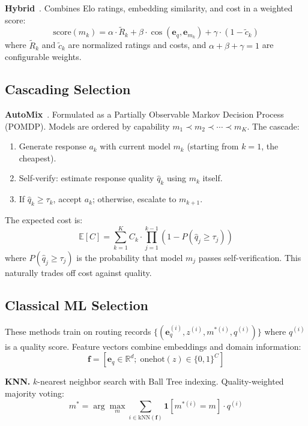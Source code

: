 \noindent\textbf{Hybrid}~\cite{hu2024routerbench}.
Combines Elo ratings, embedding similarity, and cost in a weighted score:
\begin{equation}
  \text{score}(m_k) = \alpha \cdot \tilde{R}_k + \beta \cdot \cos(\mathbf{e}_q, \mathbf{e}_{m_k}) + \gamma \cdot (1 - \tilde{c}_k)
\end{equation}
where $\tilde{R}_k$ and $\tilde{c}_k$ are normalized ratings and costs, and $\alpha + \beta + \gamma = 1$ are configurable weights.

\subsection{Cascading Selection}

\noindent\textbf{AutoMix}~\cite{aggarwal2023automix}.
Formulated as a Partially Observable Markov Decision Process (POMDP).
Models are ordered by capability $m_1 \prec m_2 \prec \cdots \prec m_K$.
The cascade:
\begin{enumerate}
  \item Generate response $a_k$ with current model $m_k$ (starting from $k=1$, the cheapest).
  \item Self-verify: estimate response quality $\hat{q}_k$ using $m_k$ itself.
  \item If $\hat{q}_k \geq \tau_k$, accept $a_k$; otherwise, escalate to $m_{k+1}$.
\end{enumerate}
The expected cost is:
\begin{equation}
  \mathbb{E}[C] = \sum_{k=1}^{K} C_k \cdot \prod_{j=1}^{k-1}(1 - P(\hat{q}_j \geq \tau_j))
\end{equation}
where $P(\hat{q}_j \geq \tau_j)$ is the probability that model $m_j$ passes self-verification.
This naturally trades off cost against quality.

\subsection{Classical ML Selection}

These methods train on routing records $\{(\mathbf{e}_q^{(i)}, z^{(i)}, m^{*(i)}, q^{(i)})\}$ where $q^{(i)}$ is a quality score.
Feature vectors combine embeddings and domain information:
\begin{equation}
  \mathbf{f} = [\mathbf{e}_q \in \mathbb{R}^d; \; \text{onehot}(z) \in \{0,1\}^C]
\end{equation}

\noindent\textbf{KNN.}
$k$-nearest neighbor search with Ball Tree indexing.
Quality-weighted majority voting:
\begin{equation}
  m^* = \arg\max_m \sum_{i \in \text{kNN}(\mathbf{f})} \mathbf{1}[m^{*(i)} = m] \cdot q^{(i)}
\end{equation}

